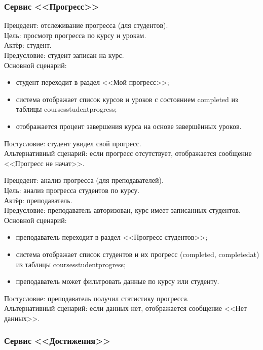 \subsubsection{Сервис <<Прогресс>>}

{Прецедент: отслеживание прогресса (для студентов)}. \\
{Цель}: просмотр прогресса по курсу и урокам. \\
{Актёр}: студент. \\
{Предусловие}: студент записан на курс. \\
{Основной сценарий}:
\begin{itemize}
	\item студент переходит в раздел <<Мой прогресс>>;
	\item система отображает список курсов и уроков с состоянием completed из таблицы coursesstudentprogress;
	\item отображается процент завершения курса на основе завершённых уроков.
\end{itemize}
{Постусловие}: студент увидел свой прогресс. \\
{Альтернативный сценарий}: если прогресс отсутствует, отображается сообщение <<Прогресс не начат>>.

{Прецедент: анализ прогресса (для преподавателей)}. \\
{Цель}: анализ прогресса студентов по курсу. \\
{Актёр}: преподаватель. \\
{Предусловие}: преподаватель авторизован, курс имеет записанных студентов. \\
{Основной сценарий}:
\begin{itemize}
	\item преподаватель переходит в раздел <<Прогресс студентов>>;
	\item система отображает список студентов и их прогресс (completed, completedat) из таблицы coursesstudentprogress;
	\item преподаватель может фильтровать данные по курсу или студенту.
\end{itemize}
{Постусловие}: преподаватель получил статистику прогресса. \\
{Альтернативный сценарий}: если данных нет, отображается сообщение <<Нет данных>>.

\subsubsection{Сервис <<Достижения>>}

